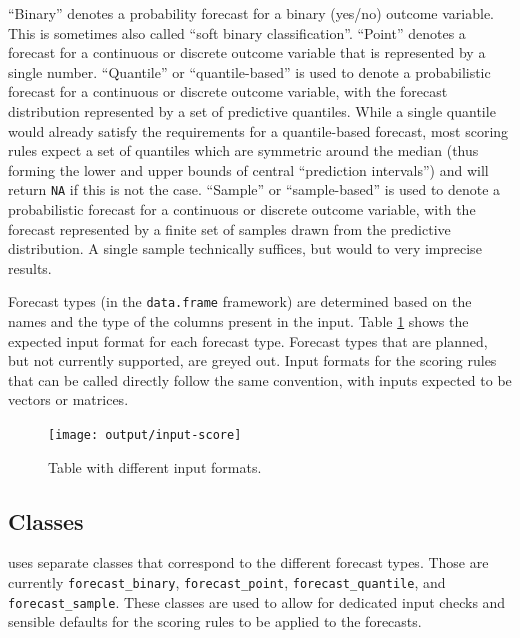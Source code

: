 \documentclass[
]{jss}
\begin{document}
``Binary'' denotes a probability forecast for a binary (yes/no) outcome
variable. This is sometimes also called ``soft binary classification''.
``Point'' denotes a forecast for a continuous or discrete outcome
variable that is represented by a single number. ``Quantile'' or
``quantile-based'' is used to denote a probabilistic forecast for a
continuous or discrete outcome variable, with the forecast distribution
represented by a set of predictive quantiles. While a single quantile
would already satisfy the requirements for a quantile-based forecast,
most scoring rules expect a set of quantiles which are symmetric around
the median (thus forming the lower and upper bounds of central
``prediction intervals'') and will return \texttt{NA} if this is not the
case. ``Sample'' or ``sample-based'' is used to denote a probabilistic
forecast for a continuous or discrete outcome variable, with the
forecast represented by a finite set of samples drawn from the
predictive distribution. A single sample technically suffices, but would
to very imprecise results.

Forecast types (in the \texttt{data.frame} framework) are determined
based on the names and the type of the columns present in the input.
Table \ref{fig:input-score} shows the expected input format for each
forecast type. Forecast types that are planned, but not currently
supported, are greyed out. Input formats for the scoring rules that can
be called directly follow the same convention, with inputs expected to
be vectors or matrices.

\begin{CodeChunk}
\begin{figure}[!h]

{\centering \texttt{[image: output/input-score]} 

}

\caption[Table with different input formats]{Table with different input formats.}\label{fig:input-score}
\end{figure}
\end{CodeChunk}

\subsection{Classes}\label{classes}

 uses separate classes that correspond to the
different forecast types. Those are currently \texttt{forecast\_binary},
\texttt{forecast\_point}, \texttt{forecast\_quantile}, and
\texttt{forecast\_sample}. These classes are used to allow for dedicated
input checks and sensible defaults for the scoring rules to be applied
to the forecasts.
\end{document}
